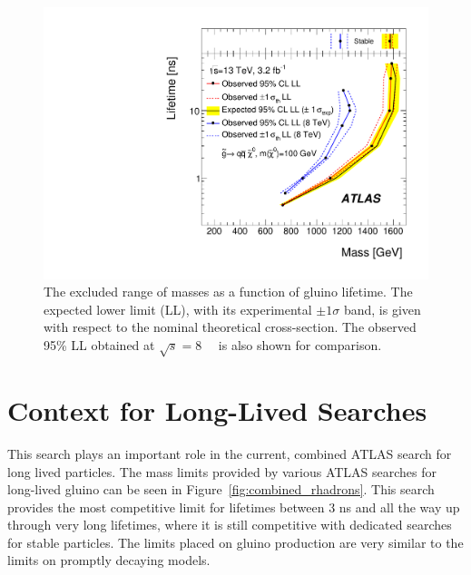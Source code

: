 \begin{figure}[htbp]
\centering
\includegraphics[width=\fullfig]{figures/taumass_exclusion.pdf}  
\caption{The excluded range of masses as a function of gluino lifetime. The expected lower limit (LL), with its experimental $\pm 1 \sigma$ band, is given with respect to the nominal theoretical cross-section. The observed 95\% LL obtained at $\sqrt{s} = 8$~\TeV~\cite{SUSY-2014-09} is also shown for comparison.}
\label{fig:mass_limits}
\end{figure}


\section{Context for Long-Lived Searches}
This search plays an important role in the current, combined \ac{ATLAS} search for long lived particles.
The mass limits provided by various \ac{ATLAS} searches for long-lived gluino \rhadrons can be seen in Figure~\ref{fig:combined_rhadrons}.
This search provides the most competitive limit for lifetimes between 3 ns and all the way up through very long lifetimes, where it is still competitive with dedicated searches for stable particles.
The limits placed on gluino production are very similar to the limits on promptly decaying models.

